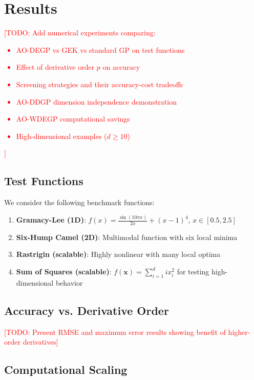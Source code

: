 \documentclass[12pt]{article}
\newcommand{\x}{\mathbf{x}}
\newcommand{\todo}[1]{\textcolor{red}{[TODO: #1]}}
\begin{document}
	\section{Results}
	\label{sec:experiments}
	
	\todo{Add numerical experiments comparing:
		\begin{itemize}
			\item AO-DEGP vs GEK vs standard GP on test functions
			\item Effect of derivative order $p$ on accuracy
			\item Screening strategies and their accuracy-cost tradeoffs
			\item AO-DDGP dimension independence demonstration
			\item AO-WDEGP computational savings
			\item High-dimensional examples ($d \geq 10$)
		\end{itemize}
	}
	
	\subsection{Test Functions}
	\label{subsec:test_functions}
	
	We consider the following benchmark functions:
	
	\begin{enumerate}
		\item \textbf{Gramacy-Lee (1D)}: $f(x) = \frac{\sin(10\pi x)}{2x} + (x-1)^4$, $x \in [0.5, 2.5]$
		\item \textbf{Six-Hump Camel (2D)}: Multimodal function with six local minima
		\item \textbf{Rastrigin (scalable)}: Highly nonlinear with many local optima
		\item \textbf{Sum of Squares (scalable)}: $f(\x) = \sum_{i=1}^{d} i x_i^2$ for testing high-dimensional behavior
	\end{enumerate}
	
	\subsection{Accuracy vs. Derivative Order}
	\label{subsec:exp_order}
	
	\todo{Present RMSE and maximum error results showing benefit of higher-order derivatives}
	
	\subsection{Computational Scaling}
	\label{subsec:exp_scaling}
	
\end{document}
